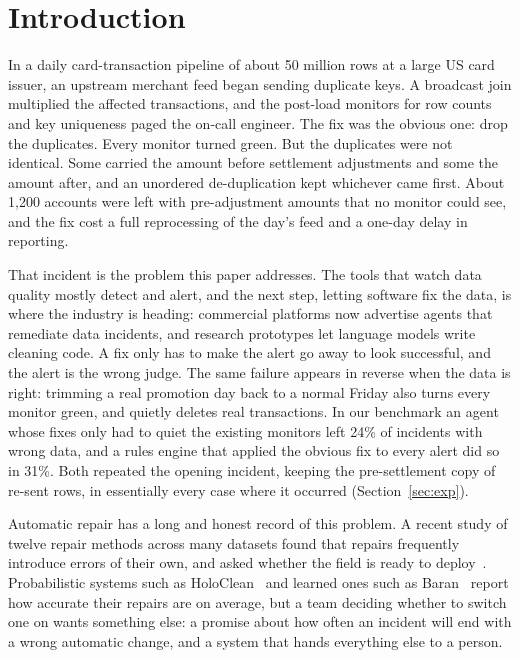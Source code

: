 \section{Introduction}

In a daily card-transaction pipeline of about 50 million rows at a large US card issuer, an upstream merchant feed began sending duplicate keys. A broadcast join multiplied the affected transactions, and the post-load monitors for row counts and key uniqueness paged the on-call engineer. The fix was the obvious one: drop the duplicates. Every monitor turned green. But the duplicates were not identical. Some carried the amount before settlement adjustments and some the amount after, and an unordered de-duplication kept whichever came first. About 1,200 accounts were left with pre-adjustment amounts that no monitor could see, and the fix cost a full reprocessing of the day's feed and a one-day delay in reporting.

That incident is the problem this paper addresses. The tools that watch data quality mostly detect and alert, and the next step, letting software fix the data, is where the industry is heading: commercial platforms now advertise agents that remediate data incidents, and research prototypes let language models write cleaning code. A fix only has to make the alert go away to look successful, and the alert is the wrong judge. The same failure appears in reverse when the data is right: trimming a real promotion day back to a normal Friday also turns every monitor green, and quietly deletes real transactions. In our benchmark an agent whose fixes only had to quiet the existing monitors left 24\% of incidents with wrong data, and a rules engine that applied the obvious fix to every alert did so in 31\%. Both repeated the opening incident, keeping the pre-settlement copy of re-sent rows, in essentially every case where it occurred (Section~\ref{sec:exp}).

Automatic repair has a long and honest record of this problem. A recent study of twelve repair methods across many datasets found that repairs frequently introduce errors of their own, and asked whether the field is ready to deploy~\cite{ni2024ready}. Probabilistic systems such as HoloClean~\cite{rekatsinas2017holoclean} and learned ones such as Baran~\cite{mahdavi2020baran} report how accurate their repairs are on average, but a team deciding whether to switch one on wants something else: a promise about how often an incident will end with a wrong automatic change, and a system that hands everything else to a person.

